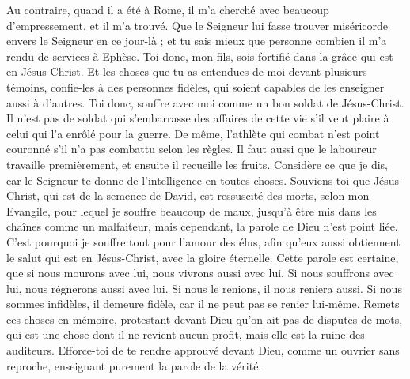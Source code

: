 \begin{multicols}{2}
Au contraire, quand il a été à Rome, il m'a cherché avec beaucoup d’empressement, et il m'a trouvé.
Que le Seigneur lui fasse trouver miséricorde envers le Seigneur en ce jour-là ; et tu sais mieux que personne combien il m'a rendu de services à Ephèse.
\VerseOne{}Toi donc, mon fils, sois fortifié dans la grâce qui est en Jésus-Christ.
Et les choses que tu as entendues de moi devant plusieurs témoins, confie-les à des personnes fidèles, qui soient capables de les enseigner aussi à d'autres.
Toi donc, souffre avec moi comme un bon soldat de Jésus-Christ.
Il n’est pas de soldat qui s'embarrasse des affaires de cette vie s’il veut plaire à celui qui l'a enrôlé pour la guerre.
De même, l’athlète qui combat n'est point couronné s'il n'a pas combattu selon les règles.
Il faut aussi que le laboureur travaille premièrement, et ensuite il recueille les fruits.
Considère ce que je dis, car le Seigneur te donne de l’intelligence en toutes choses.
Souviens-toi que Jésus-Christ, qui est de la semence de David, est ressuscité des morts, selon mon Evangile,
pour lequel je souffre beaucoup de maux, jusqu'à être mis dans les chaînes comme un malfaiteur, mais cependant, la parole de Dieu n'est point liée.
C'est pourquoi je souffre tout pour l'amour des élus, afin qu'eux aussi obtiennent le salut qui est en Jésus-Christ, avec la gloire éternelle.
Cette parole est certaine, que si nous mourons avec lui, nous vivrons aussi avec lui.
Si nous souffrons avec lui, nous régnerons aussi avec lui. Si nous le renions, il nous reniera aussi.
Si nous sommes infidèles, il demeure fidèle, car il ne peut pas se renier lui-même.
Remets ces choses en mémoire, protestant devant Dieu qu'on ait pas de disputes de mots, qui est une chose dont il ne revient aucun profit, mais elle est la ruine des auditeurs.
Efforce-toi de te rendre approuvé devant Dieu, comme un ouvrier sans reproche, enseignant purement la parole de la vérité.

\end{multicols}
